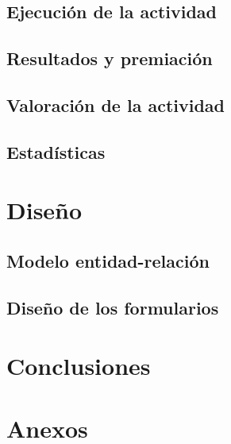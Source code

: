 \documentclass{article}
\begin{document}
\subsection{Ejecución de la actividad}

\subsection{Resultados y premiación}

\subsection{Valoración de la actividad}

\subsection{Estadísticas}

\section{Diseño}

\subsection{Modelo entidad-relación}

\subsection{Diseño de los formularios}

\section{Conclusiones}







\newpage

\section{Anexos}
\label{sec:anexos}


\label{doc:ficha-tecnica}



\newpage

\thispagestyle{empty}

\vspace*{0.3\textwidth}

\begin{figure}[h]
  \centering
  
\end{figure}
\end{document}
